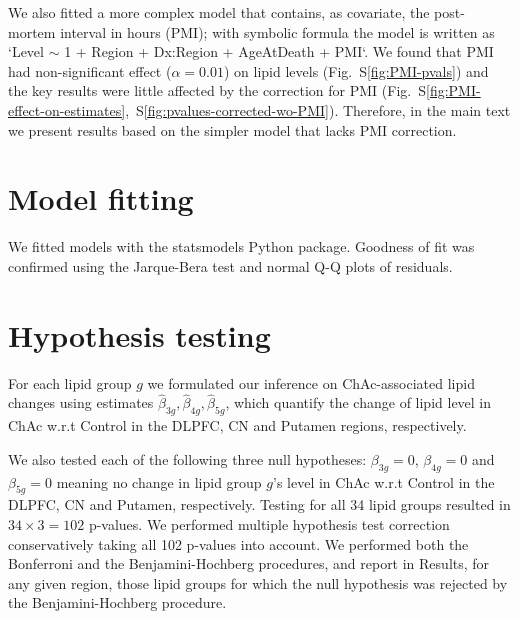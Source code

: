\documentclass[letterpaper]{article}
\begin{document}
We also fitted a more complex model that contains, as covariate, the
post-mortem interval in hours (PMI); with symbolic formula the model is
written as `Level $\sim$ 1 + Region + Dx:Region + AgeAtDeath + PMI`.  We found
that PMI had non-significant effect ($\alpha=0.01$) on lipid levels
(Fig.~S\ref{fig:PMI-pvals}) and the key results were little affected by the
correction for PMI
(Fig.~S\ref{fig:PMI-effect-on-estimates},~S\ref{fig:pvalues-corrected-wo-PMI}).
Therefore, in the main text we present results based on the simpler model that
lacks PMI correction.

\section{Model fitting}

We fitted models with the statsmodels Python package.  Goodness of fit was
confirmed using the Jarque-Bera test and normal Q-Q plots of
residuals.

\section{Hypothesis testing}

For each lipid group $g$ we formulated our inference on ChAc-associated lipid
changes using estimates $\hat{\beta}_{3g}, \hat{\beta}_{4g},
\hat{\beta}_{5g}$, which quantify the change of lipid level in ChAc w.r.t
Control in the DLPFC, CN and Putamen regions, respectively.

We also tested each of the following three null hypotheses: $\beta_{3g} = 0$,
$\beta_{4g} = 0$ and $\beta_{5g} = 0$ meaning no change in lipid group $g$'s
level in ChAc w.r.t Control in the DLPFC, CN and Putamen, respectively.
Testing for all 34 lipid groups resulted in $34 \times 3 = 102$ p-values.
We performed multiple hypothesis test correction conservatively taking all 102
p-values into account.  We performed both the Bonferroni and the
Benjamini-Hochberg procedures, and report in Results, for any given region,
those lipid groups for which the null hypothesis was rejected by the
Benjamini-Hochberg procedure.

\cleardoublepage
{}
{}



\pagebreak
\end{document}
